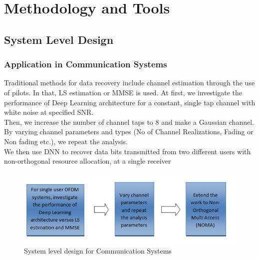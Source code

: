 
\chapter{Methodology and Tools} %
\label{Chapter3}
\lhead{} %

\section{System Level Design}
\subsection{Application in Communication Systems}
Traditional methods for data recovery include channel estimation through the use of pilots. In that, LS estimation or MMSE is used. At first, we investigate the performance of Deep Learning architecture for a constant, single tap channel with white noise at specified SNR.   \\
Then, we increase the number of channel taps to 8 and make a Gaussian channel. By varying channel parameters and types (No of Channel Realizations, Fading or Non fading etc.), we repeat the analysis. \\
We then use DNN to recover data bits transmitted from two different users with non-orthogonal resource allocation, at a single receiver
\begin{figure}[htbp]
  \centering
  \includegraphics[width=\textwidth]{./Figures/comm_design.png}
  \caption{System level design for Communication Systems}
  \label{fig:comm_design}
\end{figure}
